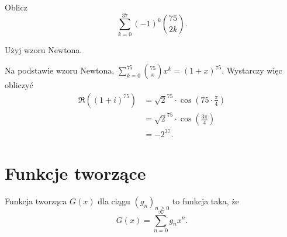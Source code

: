 \documentclass[bibliography=totocnumbered]{scrartcl}
\begin{document}
    \begin{problem}
        Oblicz
        $$ \sum_{k = 0}^{37} (-1)^k\binom{75}{2k}. $$
        \begin{hint}
            Użyj wzoru Newtona.
        \end{hint}
        \begin{answer}
            Na podstawie wzoru Newtona, $\sum_{k = 0}^{75}\binom{75}{x}x^k = (1 + x)^{75}$. Wystarczy więc obliczyć
            \begin{align*}
                \Re\left((1 + i)^{75}\right) &= \sqrt{2}^{75} \cdot \cos\left(75\cdot\frac{\pi}{4}\right) \\
                                              &= \sqrt{2}^{75} \cdot \cos\left(\frac{3\pi}{4}\right) \\
                                              &= -2^{37}.
            \end{align*}
        \end{answer}
    \end{problem}

\section{Funkcje tworzące}
    \begin{definition}
        Funkcja tworząca $G(x)$ dla ciągu $(g_n)_{n\geq 0}$ to funkcja taka, że
        $$ G(x) = \sum_{n = 0}^\infty g_nx^n. $$
    \end{definition}
\end{document}
